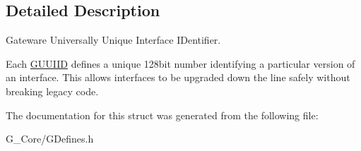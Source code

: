 \subsection{Detailed Description}
Gateware Universally Unique Interface I\+Dentifier. 

Each \mbox{\hyperlink{struct_g_w_1_1_g_u_u_i_i_d}{G\+U\+U\+I\+ID}} defines a unique 128bit number identifying a particular version of an interface. This allows interfaces to be upgraded down the line safely without breaking legacy code. 

The documentation for this struct was generated from the following file\+:\begin{DoxyCompactItemize}
\item 
G\+\_\+\+Core/G\+Defines.\+h\end{DoxyCompactItemize}
